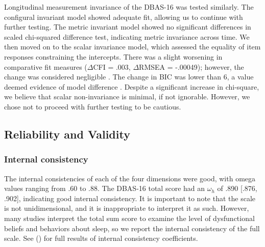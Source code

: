 \documentclass[
  12pt,
  twoside,
  openright,
  a4paper,
  chapter=TITLE,
  section=TITLE,
  brazil]{abntex2}
\begin{document}
Longitudinal measurement invariance of the DBAS-16 was tested similarly.
The configural invariant model showed adequate fit, allowing us to
continue with further testing. The metric invariant model showed no
significant differences in scaled chi-squared difference test,
indicating metric invariance across time. We then moved on to the scalar
invariance model, which assessed the equality of item responses
constraining the intercepts. There was a slight worsening in comparative
fit measures (\(\Delta\)CFI = .003, \(\Delta\)RMSEA = -.00049); however,
the change was considered negligible \autocite{chen2007,meade2008}. The
change in BIC was lower than 6, a value deemed evidence of model
difference \autocite{raftery1995}. Despite a significant increase in
chi-square, we believe that scalar non-invariance is minimal, if not
ignorable. However, we chose not to proceed with further testing to be
cautious.

\hypertarget{reliability-and-validity-1}{%
\subsection{Reliability and Validity}\label{reliability-and-validity-1}}

\hypertarget{internal-consistency}{%
\subsubsection{Internal consistency}\label{internal-consistency}}

The internal consistencies of each of the four dimensions were good,
with omega values ranging from .60 to .88. The DBAS-16 total score had
an \(\omega_h\) of .890 {[}.876, .902{]}, indicating good internal
consistency. It is important to note that the scale is not
unidimensional, and it is inappropriate to interpret it as such.
However, many studies interpret the total sum score to examine the level
of dysfunctional beliefs and behaviors about sleep, so we report the
internal consistency of the full scale. See
(\textcite{internal-consistency}) for full results of internal
consistency coefficients.
\end{document}
